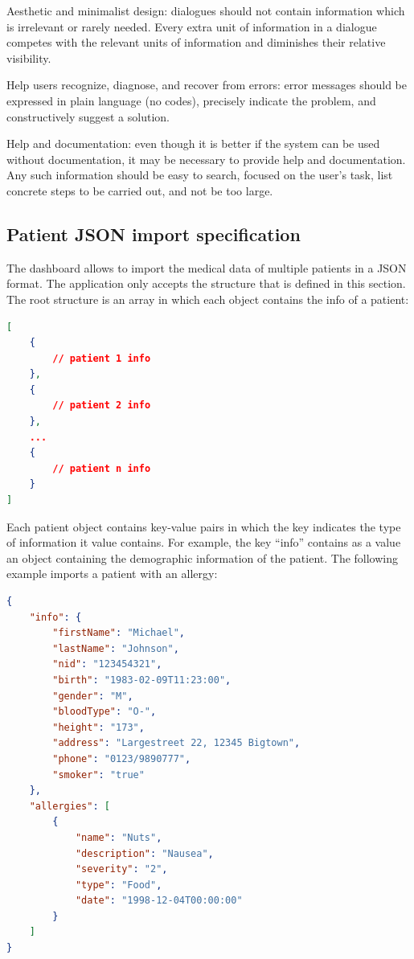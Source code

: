 \begin{nielsenenumerate}
        \item Aesthetic and minimalist design: dialogues should not contain information which is irrelevant or rarely needed. Every extra unit of information in a dialogue competes with the relevant units of information and diminishes their relative visibility.
        \item Help users recognize, diagnose, and recover from errors: error messages should be expressed in plain language (no codes), precisely indicate the problem, and constructively suggest a solution.
        \item Help and documentation: even though it is better if the system can be used without documentation, it may be necessary to provide help and documentation. Any such information should be easy to search, focused on the user's task, list concrete steps to be carried out, and not be too large.
    \end{nielsenenumerate}

\newpage
\subsection{Patient JSON import specification}\label{json_import}

    The dashboard allows to import the medical data of multiple patients in a JSON format. The application only accepts the structure that is defined in this section. The root structure is an array in which each object contains the info of a patient:

\begin{lstlisting}[language=json,firstnumber=1]
[
    {
        // patient 1 info
    },
    {
        // patient 2 info
    },
    ...
    {
        // patient n info
    }
]
\end{lstlisting}

    Each patient object contains key-value pairs in which the key indicates the type of information it value contains. For example, the key ``info'' contains as a value an object containing the demographic information of the patient. The following example imports a patient with an allergy:
\begin{lstlisting}[language=json,firstnumber=1]
{
    "info": {
        "firstName": "Michael",
        "lastName": "Johnson",
        "nid": "123454321",
        "birth": "1983-02-09T11:23:00",
        "gender": "M",
        "bloodType": "O-",
        "height": "173",
        "address": "Largestreet 22, 12345 Bigtown",
        "phone": "0123/9890777",
        "smoker": "true"
    },
    "allergies": [
        {
            "name": "Nuts",
            "description": "Nausea",
            "severity": "2",
            "type": "Food",
            "date": "1998-12-04T00:00:00"
        }
    ]
}
\end{lstlisting}

